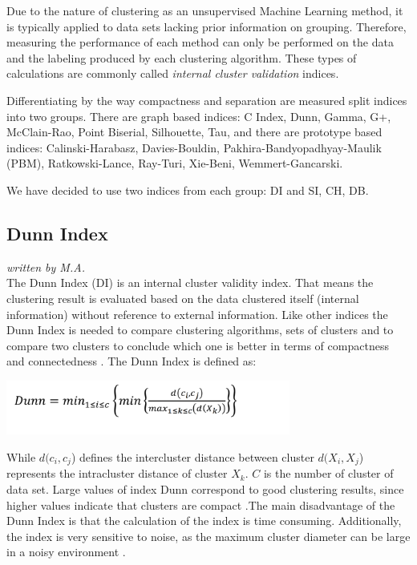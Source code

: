 Due to the nature of clustering as an unsupervised Machine Learning method, it is typically applied to data sets lacking prior information on grouping. Therefore, measuring the performance of each method can only be performed on the data and the labeling produced by each clustering algorithm. These types of calculations are commonly called \textit{internal cluster validation} indices.

Differentiating by the way compactness and separation are measured \cite{balbi2016cosine} split indices into two groups. There are graph based indices: C Index, Dunn, Gamma, G+, McClain-Rao, Point Biserial, Silhouette, Tau, and there are prototype based indices: Calinski-Harabasz, Davies-Bouldin, Pakhira-Bandyopadhyay-Maulik (PBM), Ratkowski-Lance, Ray-Turi, Xie-Beni, Wemmert-Gancarski. 

We have decided to use two indices from each group: \gls{DI} and \gls{SI}, \gls{CH}, \gls{DB}.


\subsection{Dunn Index}
\textit{written by M.A.}\\


The Dunn Index (DI) is an internal cluster validity index. That means the clustering result is evaluated based on the data clustered itself (internal information) without reference to external information. Like other indices the Dunn Index is needed to compare clustering algorithms, sets of clusters and to compare two clusters to conclude which one is better in terms of compactness and connectedness \cite{dunn-website}.
The Dunn Index is defined as: \newline

\includegraphics[width=0.7\textwidth]{images/dunn.png}
    
While $d(c_{i},c_{j}$) defines the intercluster distance between cluster $d(X_{i},X_{j}$) represents the intracluster distance of cluster $X_{k}$. \newline
$C$ is the number of cluster of data set.
Large values of index Dunn correspond to good clustering results, since higher values indicate that clusters are compact \cite{ballarin2015cluster}.The main disadvantage of the Dunn Index is that the calculation of the index is time consuming. Additionally, the index is very sensitive to noise, as the maximum cluster diameter can be large in a noisy environment \cite{ballarin2015cluster,rendon2011internal}. \newline

